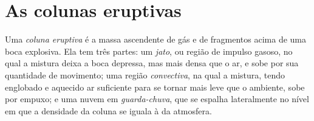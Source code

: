 \section{As colunas eruptivas}

\begin{definition}\label{def:b2:eruptive-styles:column}
Uma \emph{coluna eruptiva} é a massa ascendente de gás e de
fragmentos acima de uma boca explosiva. Ela tem três partes: um \emph{jato}, ou
região de impulso gasoso, no qual a mistura deixa a boca depressa, mas mais densa que o
ar, e sobe por sua quantidade de movimento; uma região \emph{convectiva}, na qual a mistura,
tendo englobado e aquecido ar suficiente para se tornar mais leve que o ambiente,
sobe por empuxo; e uma nuvem em \emph{guarda-chuva}, que se espalha lateralmente no
nível em que a densidade da coluna se iguala à da atmosfera.
\end{definition}


